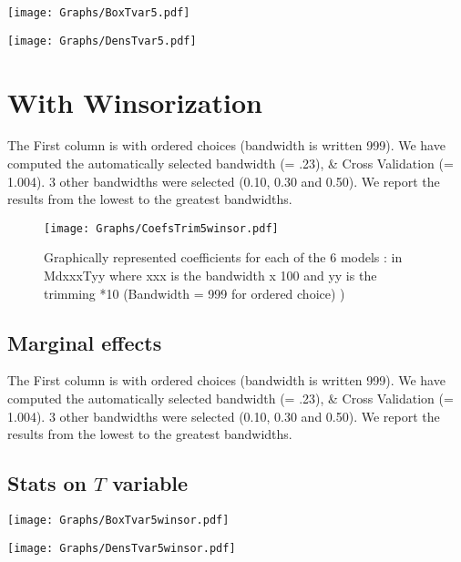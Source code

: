 \documentclass[a4paper]{article}
\begin{document}
\texttt{[image: Graphs/BoxTvar5.pdf]}


\texttt{[image: Graphs/DensTvar5.pdf]}

\section{With Winsorization}
The First column is with ordered choices (bandwidth is written 999). We  have computed the  automatically selected bandwidth  (= .23), \& Cross Validation (= 1.004). 3 other  bandwidths were selected (0.10, 0.30 and 0.50). We report the results from the lowest to the greatest bandwidths. \\



\newpage

\begin{sidewaysfigure}[h!]
\caption{Graphically represented coefficients for each of the 6 models : in MdxxxTyy  where xxx is the bandwidth x 100 and yy is the trimming *10 (Bandwidth = 999 for ordered choice) )}\label{PlotFOK}
\texttt{[image: Graphs/CoefsTrim5winsor.pdf]}

\end{sidewaysfigure}
\clearpage

\subsection{Marginal effects}
%


The First column is with ordered choices (bandwidth is written 999). We  have computed the  automatically selected bandwidth  (= .23), \& Cross Validation (= 1.004). 3 other  bandwidths were selected (0.10, 0.30 and 0.50). We report the results from the lowest to the greatest bandwidths. \\



\newpage
\subsection{Stats on $T$ variable}



\texttt{[image: Graphs/BoxTvar5winsor.pdf]}


\texttt{[image: Graphs/DensTvar5winsor.pdf]}
\end{document}
